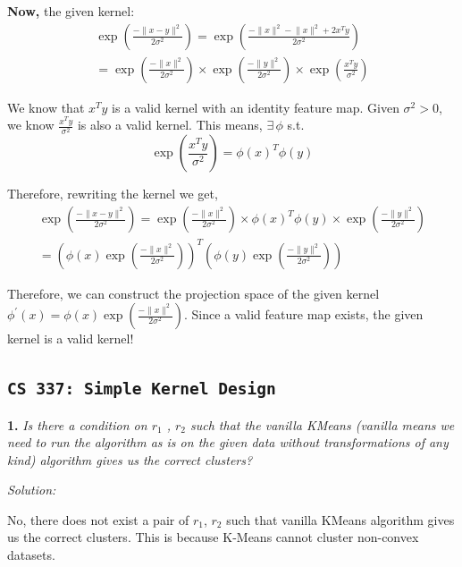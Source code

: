 \documentclass[11pt]{article}
\begin{document}
\textbf{Now,} the given kernel: %
\begin{gather*}
    \exp\left( \frac{-\lVert x-y \rVert^{2}}{2\sigma^{2}} \right) = \exp\left( \frac{-\lVert x \rVert^{2} -\lVert x \rVert^{2} + 2x^{T}y}{2\sigma^{2}} \right) \\
    = \exp\left( \frac{-\lVert x \rVert^{2}}{2\sigma^{2}} \right) \times \exp\left( \frac{-\lVert y \rVert^{2}}{2\sigma^{2}} \right) \times \exp\left( \frac{x^{T}y}{\sigma^{2}} \right)
\end{gather*}

We know that $x^{T}y$ is a valid kernel with an identity feature map. Given $\sigma^{2} > 0$, we know $\frac{x^{T}y}{\sigma^2}$ is also a valid kernel. This means, $\exists \, \phi$ s.t. %
\begin{equation*}
    \exp\left( \frac{x^{T}y}{\sigma^2} \right) = \phi(x)^{T}\phi(y)
\end{equation*}

Therefore, rewriting the kernel we get,%
\begin{gather*}
    \exp\left( \frac{-\lVert x-y \rVert^{2}}{2\sigma^{2}} \right) = \exp\left( \frac{-\lVert x \rVert^{2}}{2\sigma^{2}} \right) \times \phi(x)^{T}\phi(y) \times \exp\left( \frac{-\lVert y \rVert^{2}}{2\sigma^{2}} \right) \\
    = \left( \phi(x)\exp\left( \frac{-\lVert x \rVert^{2}}{2\sigma^{2}} \right) \right)^{T} \left( \phi(y)\exp\left( \frac{-\lVert y \rVert^{2}}{2\sigma^{2}} \right) \right)
\end{gather*}

Therefore, we can construct the projection space of the given kernel $\phi^{'}(x) = \phi(x)\exp\left( \frac{-\lVert x \rVert^{2}}{2\sigma^{2}} \right)$. Since a valid feature map exists, the given kernel is a valid kernel!


\subsection{\texttt{CS 337: Simple Kernel Design}}

\textbf{1. } \textit{Is there a condition on $r_1$ , $r_2$ such that the vanilla KMeans (vanilla means we need to run the algorithm as is on the given data without transformations of any kind) algorithm gives us the correct clusters?}

\textit{Solution: } 

No, there does not exist a pair of $r_1$, $r_2$ such that vanilla KMeans algorithm gives us the correct clusters. This is because K-Means cannot cluster non-convex datasets.
\end{document}

